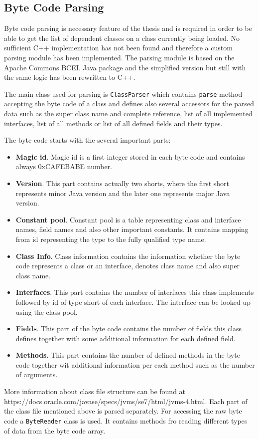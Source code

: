 \subsection{Byte Code Parsing}
Byte code parsing is necessary feature of the thesis and is required in order to be able to get the list of dependent classes on a class currently being loaded. No sufficient C++ implementation has not been found and therefore a custom parsing module has been implemented. The parsing module is based on the Apache Commons BCEL Java package and the simplified version but still with the same logic has been rewritten to C++.

The main class used for parsing is \texttt{ClassParser} which contains \texttt{parse} method accepting the byte code of a class and defines also several accessors  for the parsed data such as the super class name and complete reference, list of all implemented interfaces, list of all methods or list of all defined fields and their types.

The byte code starts with the several important parts:
\begin{itemize}
	\item \textbf{Magic id}. Magic id is a first integer stored in each byte code and contains  always 0xCAFEBABE number.
	\item \textbf{Version}. This part contains actually two shorts, where the first short represents minor Java version and the later one represents major Java version.
	\item \textbf{Constant pool}. Constant pool is a table representing class and interface names, field names and also other important constants. It contains mapping from id representing the type to the fully qualified type name.
	\item \textbf{Class Info}. Class information contains the information whether the byte code represents a class or an interface, denotes class name and also super class name.
	\item \textbf{Interfaces}. This part contains the number of interfaces this class implements followed by id of type short of each interface. The interface can be looked up using the class pool.
	\item \textbf{Fields}. This part of the byte code contains the number of fields this class defines together with some additional information for each defined field.
	\item \textbf{Methods}. This part contains the number of defined methods in the byte code together wit additional information per each method such as the number of arguments.
\end{itemize}
More information about class file structure can be found at https://docs.oracle.com/javase/specs/jvms/se7/html/jvms-4.html. 
Each part of the class file mentioned above is parsed separately. For accessing the raw byte code a \texttt{ByteReader} class is used. It contains methods fro reading different types of data from the byte code array. 

